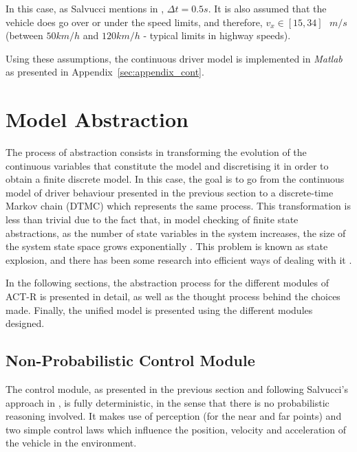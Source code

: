 In this case, as Salvucci mentions in \cite{salvucci_1}, $\Delta t = 0.5s$. It is also assumed that the vehicle does go over or under the speed limits, and therefore, $v_x \in [15, 34]\text{ }m/s$ (between $50km/h$ and $120km/h$ - typical limits in highway speeds).

Using these assumptions, the continuous driver model is implemented in \textit{Matlab} as presented in Appendix~\ref{sec:appendix_cont}.

\section{Model Abstraction}

The process of abstraction consists in transforming the evolution of the continuous variables that constitute the model and discretising it in order to obtain a finite discrete model. In this case, the goal is to go from the continuous model of driver behaviour presented in the previous section to a discrete-time Markov chain (DTMC) which represents the same process. This transformation is less than trivial due to the fact that, in model checking of finite state abstractions, as the number of state variables in the system increases, the size of the system state space grows exponentially \cite{state_explosion}. This problem is known as state explosion, and there has been some research into efficient ways of dealing with it \cite{abstraction_1, abstraction_2}. 

In the following sections, the abstraction process for the different modules of ACT-R is presented in detail, as well as the thought process behind the choices made. Finally, the unified model is presented using the different modules designed.

\subsection{Non-Probabilistic Control Module}

The control module, as presented in the previous section and following Salvucci's approach in \cite{salvucci_1}, is fully deterministic, in the sense that there is no probabilistic reasoning involved. It makes use of perception (for the near and far points) and two simple control laws which influence the position, velocity and acceleration of the vehicle in the environment.

